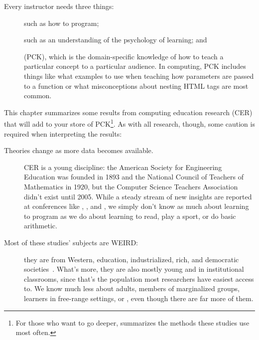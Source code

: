 
Every instructor needs three things:

\begin{description}

\item[]
  such as how to program;

\item[]
  such as an understanding of the psychology of learning;
  and

\item[]
  (PCK),
  which is the domain-specific knowledge of
  how to teach a particular concept to a particular audience.
  In computing,
  PCK includes things like what examples to use when teaching how parameters are passed to a function
  or what misconceptions about nesting HTML tags are most common.

\end{description}

This chapter summarizes some results from computing education research (CER)
that will add to your store of PCK\footnote{
  For those who want to go deeper,
  \cite{Ihan2016} summarizes the methods these studies use most often.}.
As with all research,
though,
some caution is required when interpreting the results:

\begin{description}

\item[Theories change as more data becomes available.]
  CER is a young discipline:
  the American Society for Engineering Education was founded in 1893
  and the National Council of Teachers of Mathematics in 1920,
  but the Computer Science Teachers Association didn't exist until 2005.
  While a steady stream of new insights are reported at conferences like ,
  ,
  and ,
  we simply don't know as much about learning to program
  as we do about learning to read,
  play a sport,
  or do basic arithmetic.

\item[Most of these studies' subjects are WEIRD:]
  they are from Western, education, industrialized, rich, and democratic societies~\cite{Henr2010}.
  What's more,
  they are also mostly young and in institutional classrooms,
  since that's the population most researchers have easiest access to.
  We know much less about adults,
  members of marginalized groups,
  learners in free-range settings,
  or ,
  even though there are far more of them.

\end{description}

